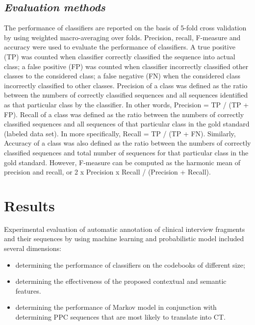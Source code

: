 \documentclass{amia}
\begin{document}
\subsection*{\textit{Evaluation methods}}
The performance of classifiers are reported on the basis of 5-fold cross validation by using weighted macro-averaging over folds. Precision, recall, F-measure and accuracy were used to evaluate the performance of classifiers. A true positive (TP) was counted when classifier correctly classified the sequence into actual class; a false positive (FP) was counted when classifier incorrectly classified other classes to the considered class; a false negative (FN) when the considered class incorrectly classified to other classes. Precision of a class was defined as the ratio between the numbers of correctly classified sequences and all sequences identified as that particular class by the classifier. In other words, Precision = TP / (TP + FP). Recall of a class was defined as the ratio between the numbers of correctly classified sequences and all sequences of that particular class in the gold standard (labeled data set). In more specifically, Recall = TP / (TP + FN). Similarly, Accuracy of a class was also defined as the ratio between the numbers of correctly classified sequences and total number of sequences for that particular class in the gold standard. However, F-measure can be computed as the harmonic mean of precision and recall, or 2 x Precision x Recall / (Precision + Recall).  

\section*{Results}
Experimental evaluation of automatic annotation of clinical interview fragments and their sequences by using machine learning and probabilistic model included several dimensions:
\begin{itemize}
\item determining the performance of classifiers on the codebooks of different size;
\item determining the effectiveness of the proposed contextual and semantic features.
\item determining the performance of Markov model in conjunction with determining PPC sequences that are most likely to translate into CT.
\end{itemize}
\end{document}
